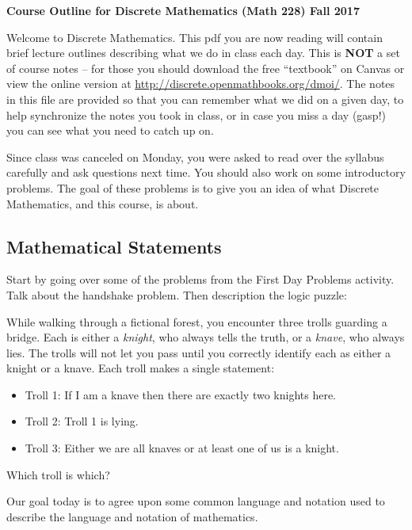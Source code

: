 \documentclass[12pt]{article}
\theoremstyle{plain}
\theoremstyle{definition}
\theoremstyle{remark}
\newcommand{\todayis}[1]{\clearpage{\rhead{\footnotesize #1}}}
\begin{document}
\thispagestyle{empty}

\begin{center}
\textbf{\Large Course Outline for Discrete Mathematics (Math 228) Fall 2017}
\end{center}

Welcome to Discrete Mathematics.  This pdf you are now reading will contain brief lecture outlines describing what we do in class each day.  This is {\bf NOT} a set of course notes -- for those you should download the free ``textbook'' on Canvas or view the online version at \url{http://discrete.openmathbooks.org/dmoi/}.  The notes in this file are provided so that you can remember what we did on a given day, to help synchronize the notes you took in class, or in case you miss a day (gasp!) you can see what you need to catch up on.

Since class was canceled on Monday, you were asked to read over the syllabus carefully and ask questions next time.  You should also work on some introductory problems.  The goal of these problems is to give you an idea of what Discrete Mathematics, and this course, is about.


\todayis{Wednesday, August 23}
\subsection*{Mathematical Statements}

 Start by going over some of the problems from the First Day Problems activity.  Talk about the handshake problem.  Then description the logic puzzle:

 While walking through a fictional forest, you encounter three trolls guarding a bridge.  Each is either a {\em knight}, who always tells the truth, or a {\em knave}, who always lies.  The trolls will not let you pass until you correctly identify each as either a knight or a knave.  Each troll makes a single statement:
 \begin{itemize}
  \item[] Troll 1: If I am a knave then there are exactly two knights here.
  \item[] Troll 2: Troll 1 is lying.
  \item[] Troll 3: Either we are all knaves or at least one of us is a knight.
 \end{itemize}
 Which troll is which?

Our goal today is to agree upon some common language and notation used to describe the language and notation of mathematics.
\end{document}
